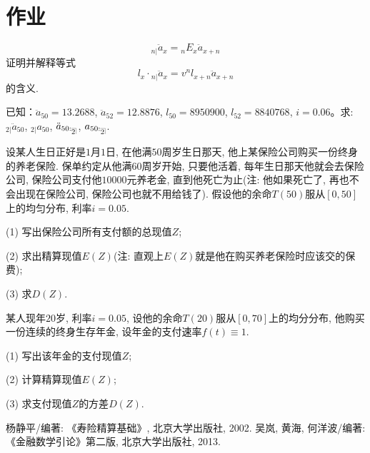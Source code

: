 \documentclass[a4paper,10pt]{ctexbook}
\makeatletter
\DeclareRobustCommand{\annu}[1]{_{%
    \def\arraystretch{0}%
    \setlength\arraycolsep{1pt}%
    \setlength\arrayrulewidth{.2pt}%
    \begin{array}[b]{@{}c|}\hline
        \\[\arraycolsep]%
        \scriptstyle #1%
    \end{array}%
}}
\makeatother
\begin{document}
\section{作业}
\begin{exs}
    $$
        {}_{n|}\ddot{a}_x = {}_nE_x\ddot{a}_{x+n}
    $$
    证明并解释等式
    $$
        l_x \cdot {}_{n|}\ddot{a}_x = v^n l_{x+n} \ddot{a}_{x+n}
    $$
    的含义.
\end{exs}

\begin{exs}
    已知：$\ddot{a}_{50} = 13.2688$, $\ddot{a}_{52} = 12.8876$, $l_{50} = 8950900$, $l_{52} = 8840768$, $i = 0.06$。求: ${}_{2|}\ddot{a}_{50}$, ${}_{2|}a_{50}$, $\ddot{a}_{50:\annu{2}}$, $a_{50:\annu{2}}$.
\end{exs}


\begin{exs}
    设某人生日正好是$1$月$1$日, 在他满$50$周岁生日那天, 他上某保险公司购买一份终身的养老保险. 保单约定从他满$60$周岁开始, 只要他活着, 每年生日那天他就会去保险公司, 保险公司支付他$10000$元养老金, 直到他死亡为止(注: 他如果死亡了, 再也不会出现在保险公司, 保险公司也就不用给钱了). 假设他的余命$T(50)$服从$[0,50]$上的均匀分布, 利率$i=0.05.$

    (1) 写出保险公司所有支付额的总现值$Z$;

    (2) 求出精算现值$E(Z)$(注: 直观上$E(Z)$就是他在购买养老保险时应该交的保费);

    (3) 求$D(Z).$
\end{exs}

\begin{exs}
    某人现年$20$岁, 利率$i = 0.05$, 设他的余命$T(20)$服从$[0, 70]$上的均分分布, 他购买一份连续的终身生存年金, 设年金的支付速率$f(t) \equiv 1$.

    (1) 写出该年金的支付现值$Z$;

    (2) 计算精算现值$E(Z)$;

    (3) 求支付现值$Z$的方差$D(Z)$.
\end{exs}


\begin{thebibliography}{99}
    杨静平/编著: 《寿险精算基础》, 北京大学出版社, 2002.
     吴岚, 黄海, 何洋波/编著: 《金融数学引论》第二版, 北京大学出版社, 2013.

\end{thebibliography}
\end{document}
